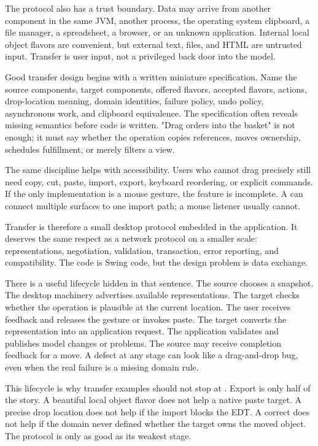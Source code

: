 The protocol also has a trust boundary. Data may arrive from another component in the same JVM, another process, the operating system clipboard, a file manager, a spreadsheet, a browser, or an unknown application. Internal local object flavors are convenient, but external text, files, and HTML are untrusted input. Transfer is user input, not a privileged back door into the model.

Good transfer design begins with a written miniature specification. Name the source components, target components, offered flavors, accepted flavors, actions, drop-location meaning, domain identities, failure policy, undo policy, asynchronous work, and clipboard equivalence. The specification often reveals missing semantics before code is written. "Drag orders into the basket" is not enough; it must say whether the operation copies references, moves ownership, schedules fulfillment, or merely filters a view.

The same discipline helps with accessibility. Users who cannot drag precisely still need copy, cut, paste, import, export, keyboard reordering, or explicit commands. If the only implementation is a mouse gesture, the feature is incomplete. A  can connect multiple surfaces to one import path; a mouse listener usually cannot.

Transfer is therefore a small desktop protocol embedded in the application. It deserves the same respect as a network protocol on a smaller scale: representations, negotiation, validation, transaction, error reporting, and compatibility. The code is Swing code, but the design problem is data exchange.

There is a useful lifecycle hidden in that sentence. The source chooses a snapshot. The desktop machinery advertises available representations. The target checks whether the operation is plausible at the current location. The user receives feedback and releases the gesture or invokes paste. The target converts the representation into an application request. The application validates and publishes model changes or problems. The source may receive completion feedback for a move. A defect at any stage can look like a drag-and-drop bug, even when the real failure is a missing domain rule.

This lifecycle is why transfer examples should not stop at . Export is only half of the story. A beautiful local object flavor does not help a native paste target. A precise drop location does not help if the import blocks the EDT. A correct  does not help if the domain never defined whether the target owns the moved object. The protocol is only as good as its weakest stage.

